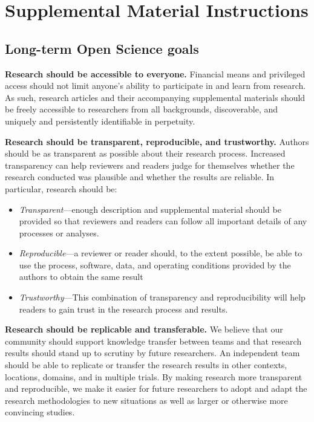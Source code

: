 \documentclass[widereview]{vgtc}             %
\begin{document}
\section{Supplemental Material Instructions}
\label{sec:supplement_inst}

\subsection{Long-term Open Science goals}

\textbf{Research should be accessible to everyone.}
Financial means and privileged access should not limit anyone's ability to participate in and learn from research.
As such, research articles and their accompanying supplemental materials should be freely accessible to researchers from all backgrounds, discoverable, and uniquely and persistently identifiable in perpetuity.

\textbf{Research should be transparent, reproducible, and trustworthy.}
Authors should be as transparent as possible about their research process.
Increased transparency can help reviewers and readers judge for themselves whether the research conducted was plausible and whether the results are reliable.
In particular, research should be:
\begin{itemize}
	\item \textit{Transparent}---enough description and supplemental material should be provided so that reviewers and readers can follow all important details of any processes or analyses.
	
	\item \textit{Reproducible}---a reviewer or reader should, to the extent possible, be able to use the process, software, data, and operating conditions provided by the authors to obtain the same result
	
	\item \textit{Trustworthy}---This combination of transparency and reproducibility will help readers to gain trust in the research process and results.
\end{itemize}
	
\textbf{Research should be replicable and transferable.}
We believe that our community should support knowledge transfer between teams and that research results should stand up to scrutiny by future researchers. An independent team should be able to replicate or transfer the research results in other contexts, locations, domains, and in multiple trials. By making research more transparent and reproducible, we make it easier for future researchers to adopt and adapt the research methodologies to new situations as well as larger or otherwise more convincing studies.
\end{document}
